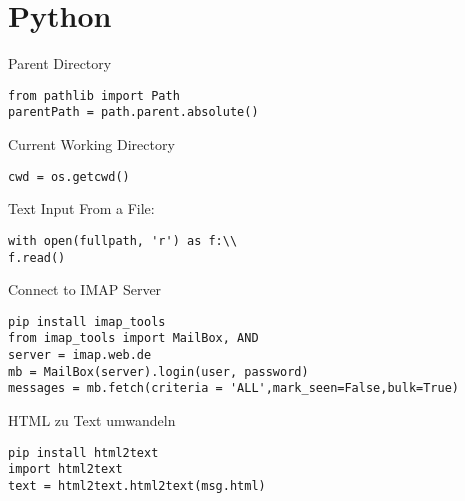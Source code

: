 \chapter{Python}\label{chap:Python}
Parent Directory
\begin{verbatim}
from pathlib import Path
parentPath = path.parent.absolute()
\end{verbatim}
Current Working Directory
\begin{Verbatim}[frame=single,baselinestretch=0.1]
cwd = os.getcwd()
\end{Verbatim}
Text Input From a File:
\begin{Verbatim}[frame=single,baselinestretch=0.01]
with open(fullpath, 'r') as f:\\
f.read()
\end{Verbatim}
Connect to IMAP Server
\begin{verbatim}
pip install imap_tools
from imap_tools import MailBox, AND
server = imap.web.de
mb = MailBox(server).login(user, password)
messages = mb.fetch(criteria = 'ALL',mark_seen=False,bulk=True)
\end{verbatim}
HTML zu Text umwandeln
\begin{verbatim}
pip install html2text
import html2text
text = html2text.html2text(msg.html)
\end{verbatim}